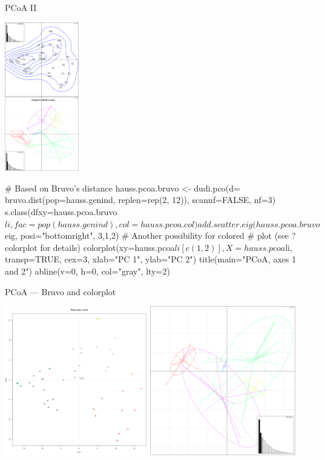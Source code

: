 \documentclass[compress, xelatex, 11pt, xcolor=svgnames, aspectratio=169,
	hyperref={
		bookmarks=true,
		unicode=true,
		colorlinks=true,
		pdftitle={Molecular data in R},
		plainpages=false,
		pdfauthor={Vojtech Zeisek},
		pdfsubject={Course about phylogeny and evolution in R},
		pdfcreator={XeLaTeX},
		pdfkeywords={R, evolution, phylogeny, molecular data},
		linkcolor=Crimson, %
		anchorcolor=Magenta, %
		citecolor=Magenta, %
		filecolor=Magenta, %
		menucolor=Magenta, %
		urlcolor=DodgerBlue, %
		},
	url={hyphens, lowtilde} %
	]{beamer}
\begin{document}
\begin{frame}[fragile]{PCoA II}
	\begin{multicols}{2}
		\begin{center}
			\includegraphics[height=6.5cm]{pcoa.png}
		\end{center}
		\columnbreak
		\begin{spluscode}
    # Based on Bruvo's distance
    hauss.pcoa.bruvo <- dudi.pco(d=
      bruvo.dist(pop=hauss.genind,
      replen=rep(2, 12)),
      scannf=FALSE, nf=3)
    s.class(dfxy=hauss.pcoa.bruvo$li,
      fac=pop(hauss.genind),
      col=hauss.pcoa.col)
    add.scatter.eig(hauss.pcoa.bruvo$
      eig, posi="bottomright", 3,1,2)
    # Another possibility for colored
    # plot (see ?colorplot for details)
    colorplot(xy=hauss.pcoa$li[c(1,2)],
      X=hauss.pcoa$li, transp=TRUE,
      cex=3, xlab="PC 1", ylab="PC 2")
    title(main="PCoA, axes 1 and 2")
    abline(v=0, h=0, col="gray", lty=2)
		\end{spluscode}
	\end{multicols}
\end{frame}

\begin{frame}{PCoA --- Bruvo and colorplot}
	\begin{center}
		\includegraphics[height=6.5cm]{pcoa-dalsi.png}
	\end{center}
\end{frame}
\end{document}
